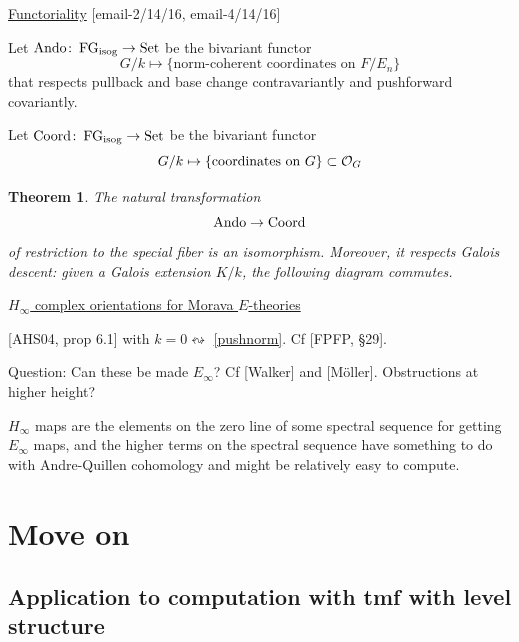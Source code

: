 \documentclass{rs}
\newtheorem{thm}{Theorem}
\theoremstyle{definition}
\theoremstyle{remark}
\def\co{\colon\thinspace}
\newcommand{\CO}{{\cal O}}
\newcommand{\Gal}{{\rm Gal}}
\newcommand{\Ando}{{\rm Ando}}
\newcommand{\Set}{{\rm Set}}
\newcommand{\FG}{{\rm FG}}
\newcommand{\isog}{{\rm isog}}
\newcommand{\Coord}{{\rm Coord}}
\renewcommand{\=}{\approx}
\renewcommand{\-}{\sim}
\numberwithin{equation}{section}
\numberwithin{thm}{section}
\begin{document}
\underline{Functoriality} [email-2/14/16, email-4/14/16] 

Let $\Ando\co\FG_\isog\to\Set$ be the bivariant functor 
\[
 G/k \mapsto \{\text{norm-coherent coordinates on $F/E_n$}\} 
\]
that respects pullback and base change contravariantly and pushforward covariantly.  

Let $\Coord\co\FG_\isog\to\Set$ be the bivariant functor 
\[
 G/k \mapsto \{\text{coordinates on $G$}\} \subset \CO_G 
\]

\begin{thm}
 The natural transformation 
 \[
  \Ando\to\Coord 
 \]
 of restriction to the special fiber is an isomorphism.  
 Moreover, it respects Galois descent: given a Galois extension $K/k$, the following diagram commutes.  
 \begin{center}
 \end{center}
\end{thm}

\underline{$H_\infty$ complex orientations for Morava $E$-theories} 

[AHS04, prop 6.1] with $k = 0 \leftrightsquigarrow$ \eqref{pushnorm}.  
Cf [FPFP, \S 29].  

Question: Can these be made $E_\infty$?  
Cf [Walker] and [M\"oller].  
Obstructions at higher height?  

$H_\infty$ maps are the
elements on the zero line of some spectral sequence for getting $E_\infty$
maps, and the higher terms on the spectral sequence have something to do
with Andre-Quillen cohomology and might be relatively easy to compute.


\newpage
\section{Move on}

\subsection{Application to computation with tmf with level structure}
\end{document}

